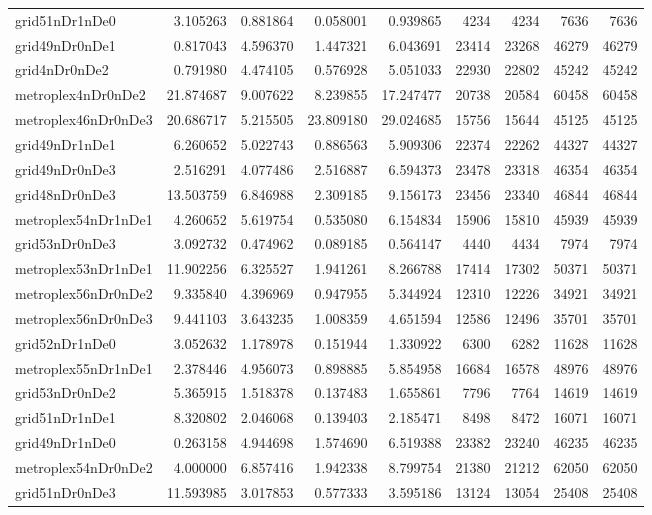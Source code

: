 \begin{longtable}{|l|r|r|r|r|r|r|r|r|}
grid51nDr1nDe0 & 3.105263 & 0.881864 & 0.058001 & 0.939865 & 4234 & 4234 & 7636 & 7636 \\
grid49nDr0nDe1 & 0.817043 & 4.596370 & 1.447321 & 6.043691 & 23414 & 23268 & 46279 & 46279 \\
grid4nDr0nDe2 & 0.791980 & 4.474105 & 0.576928 & 5.051033 & 22930 & 22802 & 45242 & 45242 \\
metroplex4nDr0nDe2 & 21.874687 & 9.007622 & 8.239855 & 17.247477 & 20738 & 20584 & 60458 & 60458 \\
metroplex46nDr0nDe3 & 20.686717 & 5.215505 & 23.809180 & 29.024685 & 15756 & 15644 & 45125 & 45125 \\
grid49nDr1nDe1 & 6.260652 & 5.022743 & 0.886563 & 5.909306 & 22374 & 22262 & 44327 & 44327 \\
grid49nDr0nDe3 & 2.516291 & 4.077486 & 2.516887 & 6.594373 & 23478 & 23318 & 46354 & 46354 \\
grid48nDr0nDe3 & 13.503759 & 6.846988 & 2.309185 & 9.156173 & 23456 & 23340 & 46844 & 46844 \\
metroplex54nDr1nDe1 & 4.260652 & 5.619754 & 0.535080 & 6.154834 & 15906 & 15810 & 45939 & 45939 \\
grid53nDr0nDe3 & 3.092732 & 0.474962 & 0.089185 & 0.564147 & 4440 & 4434 & 7974 & 7974 \\
metroplex53nDr1nDe1 & 11.902256 & 6.325527 & 1.941261 & 8.266788 & 17414 & 17302 & 50371 & 50371 \\
metroplex56nDr0nDe2 & 9.335840 & 4.396969 & 0.947955 & 5.344924 & 12310 & 12226 & 34921 & 34921 \\
metroplex56nDr0nDe3 & 9.441103 & 3.643235 & 1.008359 & 4.651594 & 12586 & 12496 & 35701 & 35701 \\
grid52nDr1nDe0 & 3.052632 & 1.178978 & 0.151944 & 1.330922 & 6300 & 6282 & 11628 & 11628 \\
metroplex55nDr1nDe1 & 2.378446 & 4.956073 & 0.898885 & 5.854958 & 16684 & 16578 & 48976 & 48976 \\
grid53nDr0nDe2 & 5.365915 & 1.518378 & 0.137483 & 1.655861 & 7796 & 7764 & 14619 & 14619 \\
grid51nDr1nDe1 & 8.320802 & 2.046068 & 0.139403 & 2.185471 & 8498 & 8472 & 16071 & 16071 \\
grid49nDr1nDe0 & 0.263158 & 4.944698 & 1.574690 & 6.519388 & 23382 & 23240 & 46235 & 46235 \\
metroplex54nDr0nDe2 & 4.000000 & 6.857416 & 1.942338 & 8.799754 & 21380 & 21212 & 62050 & 62050 \\
grid51nDr0nDe3 & 11.593985 & 3.017853 & 0.577333 & 3.595186 & 13124 & 13054 & 25408 & 25408 \\

\end{longtable}
